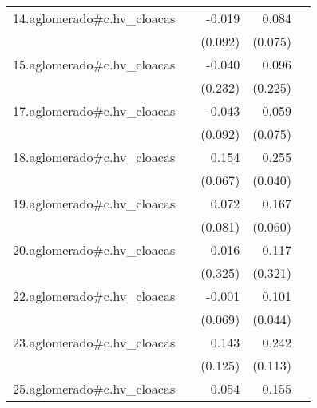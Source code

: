 {\begin{longtable}{l*{4}{D{.}{.}{-1}}}
\addlinespace
14.aglomerado#c.hv\_cloacas&                     &      -0.019         &       0.084         &                     \\
            &                     &     (0.092)         &     (0.075)         &                     \\
\addlinespace
15.aglomerado#c.hv\_cloacas&                     &      -0.040         &       0.096         &                     \\
            &                     &     (0.232)         &     (0.225)         &                     \\
\addlinespace
17.aglomerado#c.hv\_cloacas&                     &      -0.043         &       0.059         &                     \\
            &                     &     (0.092)         &     (0.075)         &                     \\
\addlinespace
18.aglomerado#c.hv\_cloacas&                     &       0.154\sym{*}  &       0.255\sym{***}&                     \\
            &                     &     (0.067)         &     (0.040)         &                     \\
\addlinespace
19.aglomerado#c.hv\_cloacas&                     &       0.072         &       0.167\sym{**} &                     \\
            &                     &     (0.081)         &     (0.060)         &                     \\
\addlinespace
20.aglomerado#c.hv\_cloacas&                     &       0.016         &       0.117         &                     \\
            &                     &     (0.325)         &     (0.321)         &                     \\
\addlinespace
22.aglomerado#c.hv\_cloacas&                     &      -0.001         &       0.101\sym{*}  &                     \\
            &                     &     (0.069)         &     (0.044)         &                     \\
\addlinespace
23.aglomerado#c.hv\_cloacas&                     &       0.143         &       0.242\sym{*}  &                     \\
            &                     &     (0.125)         &     (0.113)         &                     \\
\addlinespace
25.aglomerado#c.hv\_cloacas&                     &       0.054         &       0.155\sym{*}  &                     \\

\end{longtable}}
